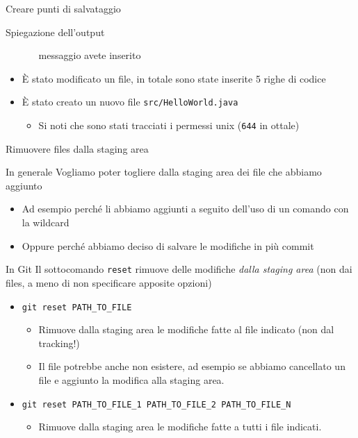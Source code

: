 \documentclass[xcolor=dvipsnames,presentation]{beamer}
\begin{document}
\begin{frame}{Creare punti di salvataggio}
\begin{block}{Spiegazione dell'output}
\begin{itemize}
\begin{itemize}
messaggio avete inserito
            \end{itemize}
            \item È stato modificato un file, in totale sono state inserite 5 righe di codice
            \item È stato creato un nuovo file \texttt{src/HelloWorld.java}
            \begin{itemize}
                \item Si noti che sono stati tracciati i permessi unix (\texttt{644} in ottale)
            \end{itemize}
        \end{itemize}
    \end{block}
\end{frame}

\begin{frame}{Rimuovere files dalla staging area}
    \begin{block}{In generale}
        Vogliamo poter togliere dalla staging area dei file che abbiamo aggiunto
        \begin{itemize}
            \item Ad esempio perché li abbiamo aggiunti a seguito dell'uso di un comando con la
wildcard
            \item Oppure perché abbiamo deciso di salvare le modifiche in più commit
        \end{itemize}
    \end{block}
    \begin{block}{In Git}
        Il sottocomando \texttt{reset} rimuove delle modifiche \textit{dalla staging area} (non dai
files, a meno di non specificare apposite opzioni)
        \begin{itemize}
            \item \texttt{git reset PATH\_TO\_FILE}
            \begin{itemize}
                \item Rimuove dalla staging area le modifiche fatte al file indicato (non dal
tracking!)
                \item Il file potrebbe anche non esistere, ad esempio se abbiamo cancellato un file
e aggiunto la modifica alla staging area.
            \end{itemize}
            \item \texttt{git reset PATH\_TO\_FILE\_1 PATH\_TO\_FILE\_2 PATH\_TO\_FILE\_N}
            \begin{itemize}
                \item Rimuove dalla staging area le modifiche fatte a tutti i file indicati.
            \end{itemize}
        \end{itemize}
    \end{block}
\end{frame}
\end{document}
